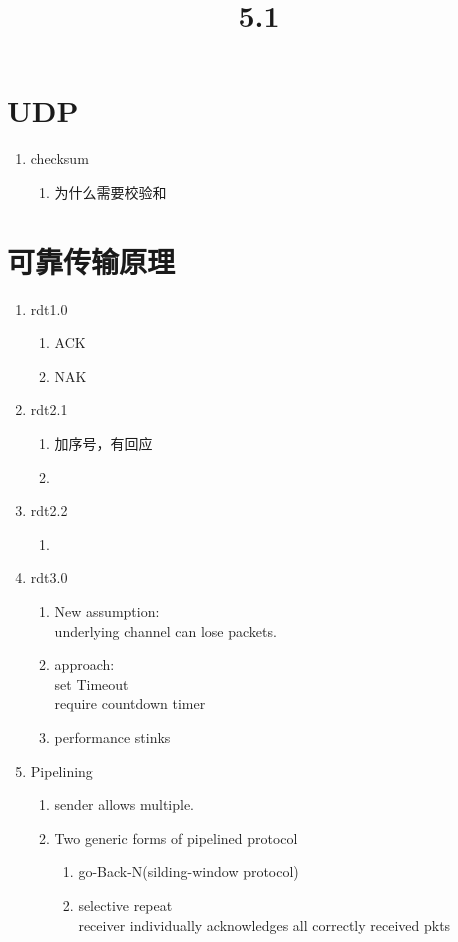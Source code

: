 \documentclass[UTF8]{article}
\title{\textbf{5.1}}
\begin{document}
\maketitle
	\section{UDP}
	\begin{enumerate}
		\item checksum
		\begin{enumerate}
			\item 为什么需要校验和
		\end{enumerate}
	\end{enumerate}
	\section{可靠传输原理}
	\begin{enumerate}
		\item rdt1.0
		\begin{enumerate}
			\item ACK
			\item NAK
		\end{enumerate}
		\item rdt2.1
		\begin{enumerate}
			\item 加序号，有回应
			\item 
		\end{enumerate}
		\item rdt2.2
		\begin{enumerate}
			\item 
		\end{enumerate}
		\item rdt3.0
		\begin{enumerate}
			\item New assumption:\\	
			underlying channel can lose packets.
			\item approach:\\
			set Timeout\\
			require countdown timer
			\item performance stinks
		\end{enumerate}
		\item Pipelining
		\begin{enumerate}
			\item sender allows multiple.
			\item Two generic forms of pipelined protocol
			\begin{enumerate}
				\item go-Back-N(silding-window protocol)
				\item selective repeat\\
				receiver individually acknowledges all correctly received pkts
			\end{enumerate}
		\end{enumerate}
	\end{enumerate}
		
\end{document}
